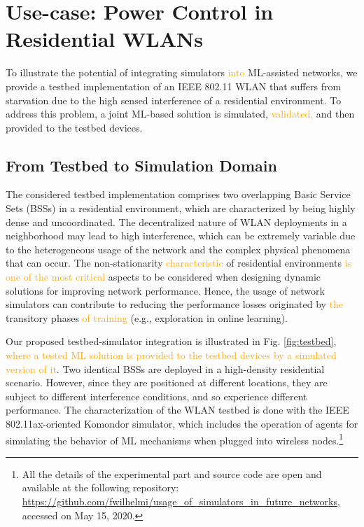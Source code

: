 \documentclass[journal]{IEEEtran}
\begin{document}
	\section{Use-case: Power Control in Residential WLANs}	
	To illustrate the potential of integrating simulators \textcolor{orange}{into} ML-assisted networks, we provide a testbed implementation of an IEEE 802.11 WLAN that suffers from starvation due to the high sensed interference of a residential environment. To address this problem, a joint ML-based solution is simulated, \textcolor{orange}{validated,} and then provided to the testbed devices.
	
	\subsection{From Testbed to Simulation Domain}
	The considered testbed implementation comprises two overlapping Basic Service Sets (BSSs) in a residential environment, which are characterized by being highly dense and uncoordinated. The decentralized nature of WLAN deployments in a neighborhood may lead to high interference, which can be extremely variable due to the heterogeneous usage of the network and the complex physical phenomena that can occur. The non-stationarity \textcolor{orange}{characteristic} of residential environments \textcolor{orange}{is one of the most critical} aspects to be considered when designing dynamic solutions for improving network performance. Hence, the usage of network simulators can contribute to reducing the performance losses originated by \textcolor{orange}{the} transitory phases \textcolor{orange}{of training} (e.g., exploration in online learning).

	Our proposed testbed-simulator integration is illustrated in Fig. \ref{fig:testbed},\textcolor{orange}{ where a tested ML solution is provided to the testbed devices by a simulated version of it}. Two identical BSSs are deployed in a high-density residential scenario. However, since they are positioned at different locations, they are subject to different interference conditions, and so experience different performance. The characterization of the WLAN testbed is done with the IEEE 802.11ax-oriented Komondor simulator, which includes the operation of agents for simulating the behavior of ML mechanisms when plugged into wireless nodes.\footnote{All the details of the experimental part and source code are open and available at the following repository: \url{https://github.com/fwilhelmi/usage_of_simulators_in_future_networks}, accessed on May 15, 2020.}
		
\end{document}
